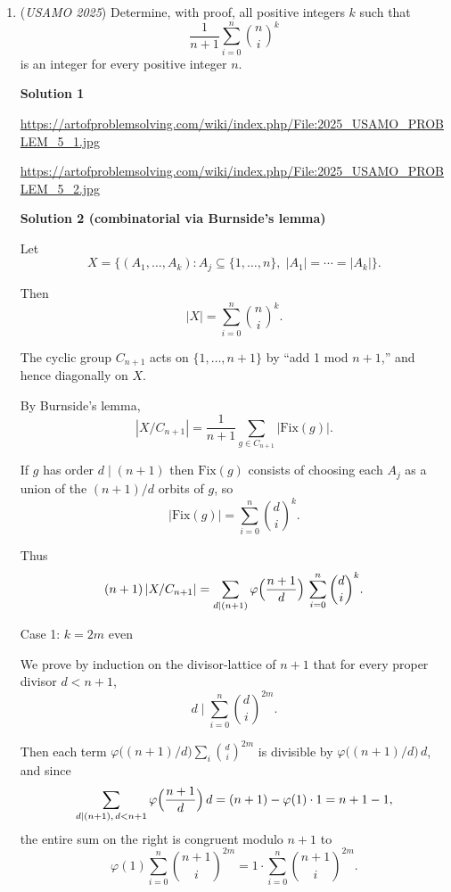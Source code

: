 \begin{enumerate}
 The determinant is obviously $0$, so we have proven the problem (clearly this brainless strategy was a lot more tedious than guessing the circumcenter. However, if one really manages to guess the circumcenter, a synthetic solution would finish it off a lot cleaner than the complex proof).

 


	\item (\textit{USAMO 2025}) Determine, with proof, all positive integers $k$ such that
 \[\frac{1}{n+1} \sum_{i=0}^n \binom{n}{i}^k\]is an integer for every positive integer $n.$




\textbf{Solution 1}

\href{https://artofproblemsolving.com/wiki/index.php/File:2025\_USAMO\_PROBLEM\_5\_1.jpg}{https://artofproblemsolving.com/wiki/index.php/File:2025\_USAMO\_PROBLEM\_5\_1.jpg}

 \href{https://artofproblemsolving.com/wiki/index.php/File:2025\_USAMO\_PROBLEM\_5\_2.jpg}{https://artofproblemsolving.com/wiki/index.php/File:2025\_USAMO\_PROBLEM\_5\_2.jpg}

 



\textbf{Solution 2 (combinatorial via Burnside’s lemma)}

Let  
 \[X=\{(A_1,\dots,A_k):A_j\subseteq\{1,\dots,n\},\;|A_1|=\cdots=|A_k|\}.\]

 Then  
 \[|X|=\sum_{i=0}^n\binom{n}{i}^k.\]

 The cyclic group $C_{n+1}$ acts on $\{1,\dots,n+1\}$ by “add 1 mod $n+1$,” and hence diagonally on $X$.

 By Burnside’s lemma,  
 \[|X/C_{n+1}|=\frac1{n+1}\sum_{g\in C_{n+1}}|\mathrm{Fix}(g)|.\]

 If $g$ has order $d\mid(n+1)$ then $\mathrm{Fix}(g)$ consists of choosing each $A_j$ as a union of the $(n+1)/d$ orbits of $g$, so  
 \[|\mathrm{Fix}(g)|=\sum_{i=0}^n\binom{d}{i}^k.\]

 Thus  
 \[(n+1)\,|X/C_{n+1}|=\sum_{d\mid(n+1)}\varphi\Bigl(\frac{n+1}d\Bigr)\, \sum_{i=0}^n\binom{d}{i}^k.\]

 Case 1: $k=2m$ even  

 We prove by induction on the divisor‐lattice of $n+1$ that for every proper divisor $d<n+1$,  
 \[d\mid\sum_{i=0}^n\binom{d}{i}^{2m}.\]

 Then each term $\varphi\bigl((n+1)/d\bigr)\sum_i\binom{d}{i}^{2m}$ is divisible by $\varphi\bigl((n+1)/d\bigr)\,d$, and since  
 \[\sum_{d\mid(n+1),\,d<n+1}\varphi\Bigl(\frac{n+1}d\Bigr)\,d =(n+1)-\varphi(1)\cdot1 =n+1-1,\]the entire sum on the right is congruent modulo $n+1$ to  
 \[\varphi(1)\sum_{i=0}^n\binom{n+1}{i}^{2m} =1\cdot\sum_{i=0}^n\binom{n+1}{i}^{2m}.\]


\end{enumerate}
